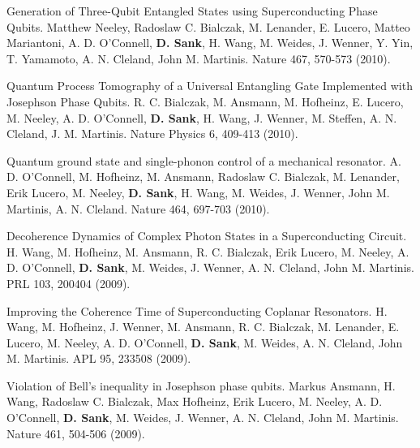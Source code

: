 \documentclass[margin=2cm,line]{res}
\newenvironment{list3}{
  \begin{list}{}{%
      \setlength{\itemsep}{0in}
      \setlength{\parsep}{0in} \setlength{\parskip}{0in}
      \setlength{\topsep}{0in} \setlength{\partopsep}{0in}
      \setlength{\leftmargin}{0.2in}}}{\end{list}}
\begin{document}
\begin{resume}
\begin{list3}
\item Generation of Three-Qubit Entangled States using Superconducting Phase Qubits. Matthew Neeley, Radoslaw C. Bialczak, M. Lenander, E. Lucero, Matteo Mariantoni, A. D. O'Connell, \textbf{D. Sank}, H. Wang, M. Weides, J. Wenner, Y. Yin, T. Yamamoto, A. N. Cleland, John M. Martinis. Nature 467, 570-573 (2010). \\

\item Quantum Process Tomography of a Universal Entangling Gate Implemented with Josephson Phase Qubits. R. C. Bialczak, M. Ansmann, M. Hofheinz, E. Lucero, M. Neeley, A. D. O'Connell, \textbf{D. Sank}, H. Wang, J. Wenner, M. Steffen, A. N. Cleland, J. M. Martinis. Nature Physics 6, 409-413 (2010). \\

\end{list3}

\pagebreak

\begin{list3}

\item Quantum ground state and single-phonon control of a mechanical resonator. A. D. O'Connell, M. Hofheinz, M. Ansmann, Radoslaw C. Bialczak, M. Lenander, Erik Lucero, M. Neeley, \textbf{D. Sank}, H. Wang, M. Weides, J. Wenner, John M. Martinis, A. N. Cleland. Nature 464, 697-703 (2010). \\

\item Decoherence Dynamics of Complex Photon States in a Superconducting Circuit. H. Wang, M. Hofheinz, M. Ansmann, R. C. Bialczak, Erik Lucero, M. Neeley, A. D. O'Connell, \textbf{D. Sank}, M. Weides, J. Wenner, A. N. Cleland, John M. Martinis. PRL 103, 200404 (2009). \\

\item Improving the Coherence Time of Superconducting Coplanar Resonators. H. Wang, M. Hofheinz, J. Wenner, M. Ansmann, R. C. Bialczak, M. Lenander, E. Lucero, M. Neeley, A. D. O'Connell, \textbf{D. Sank}, M. Weides, A. N. Cleland, John M. Martinis. APL 95, 233508 (2009). \\

\item Violation of Bell's inequality in Josephson phase qubits. Markus Ansmann, H. Wang, Radoslaw C. Bialczak, Max Hofheinz, Erik Lucero, M. Neeley, A. D. O'Connell, \textbf{D. Sank}, M. Weides, J. Wenner, A. N. Cleland, John M. Martinis. Nature 461, 504-506 (2009).


\end{list3}
\end{resume}
\end{document}
